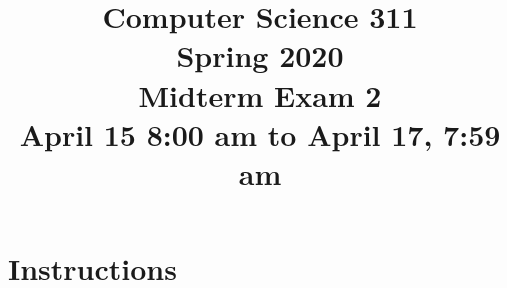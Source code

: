 \documentclass[12pt]{amsart}
\begin{document}


\title{
Computer Science 311\\
Spring 2020\\
Midterm Exam 2 \\
April 15 8:00 am to April 17, 7:59 am
}

\maketitle



\section*{Instructions}
\end{document}

